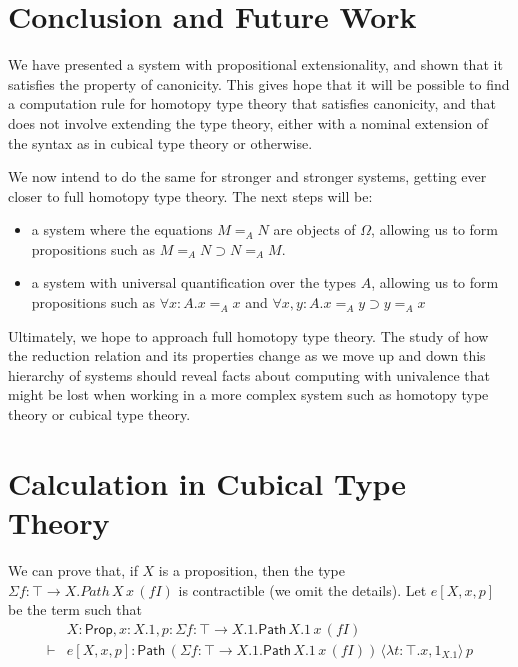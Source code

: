 \documentclass[a4paper,UKenglish]{lipics-v2016}
\newcommand{\Path}[3]{\ensuremath{\mathsf{Path} \, {#1} \, {#2} \, {#3}}}
\newcommand{\Prop}{\mathsf{Prop}}
\theoremstyle{plain}
\theoremstyle{definition}
\begin{document}
\section{Conclusion and Future Work}

We have presented a system with propositional extensionality, and shown that it satisfies the property of canonicity.
This gives hope that it will be possible to find a computation rule for homotopy type theory that satisfies canonicity, and
that does not involve extending the type theory, either with a nominal extension of the syntax as in cubical type theory or
otherwise.

We now intend to do the same for stronger and stronger systems, getting
ever closer to full homotopy type theory.  The next steps will be:

\begin{itemize}
\item
a system where the equations $M =_A N$ are objects of $\Omega$, allowing us to form propositions such as $M =_A N \supset N =_A M$.
\item
a system with universal quantification over the types $A$, allowing us to form propositions such as $\forall x:A. x =_A x$ and
$\forall x,y : A. x =_A y \supset y =_A x$
\end{itemize}

Ultimately, we hope to approach full homotopy type theory.  The study of how the reduction relation and its properties change as we
move up and down this hierarchy of systems should reveal facts about computing with univalence that might be lost when working in
a more complex system such as homotopy type theory or cubical type theory.



\appendix

\section{Calculation in Cubical Type Theory}
\label{appendix:cubical}

\newcommand{\steptwo}{\mathsf{step}_2}
\newcommand{\stepthree}{\mathsf{step}_3}

We can prove that, if $X$ is a proposition, then the type $\Sigma f:\top \rightarrow X. Path \, X \, x \, (f I)$ is contractible (we omit the details).  Let $e[X, x, p]$ be the term such that
\begin{align*} & X : \Prop, x : X.1, p : \Sigma f:\top \rightarrow X.1. \Path{X.1}{x}{(fI)} \\
\vdash & e[X, x, p] : \Path{(\Sigma f:\top \rightarrow X.1. \Path{X.1}{x}{(f I)})}{\langle \lambda t : \top . x, 1_{X.1} \rangle}{p}
\end{align*}
\end{document}
